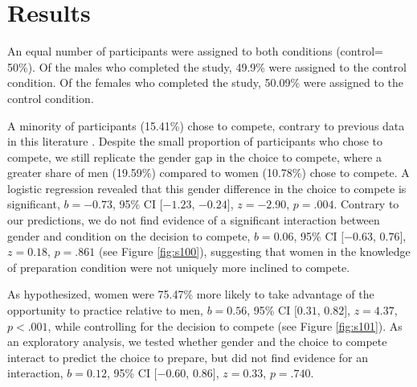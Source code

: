\documentclass[a4paper, nobind]{templates/ociamthesis}
\begin{document}
\hypertarget{results}{%
\section{Results}\label{results}}

An equal number of participants were assigned to both conditions (control= 50\%). Of the males who completed the study, 49.9\% were assigned to the control condition. Of the females who completed the study, 50.09\% were assigned to the control condition.

A minority of participants (15.41\%) chose to compete, contrary to previous data in this literature \autocite{Niederle2007}. Despite the small proportion of participants who chose to compete, we still replicate the gender gap in the choice to compete, where a greater share of men (19.59\%) compared to women (10.78\%) chose to compete. A logistic regression revealed that this gender difference in the choice to compete is significant, \(b = -0.73\), 95\% CI \([-1.23\), \(-0.24]\), \(z = -2.90\), \(p = .004\). Contrary to our predictions, we do not find evidence of a significant interaction between gender and condition on the decision to compete, \(b = 0.06\), 95\% CI \([-0.63\), \(0.76]\), \(z = 0.18\), \(p = .861\) (see Figure \ref{fig:s100}), suggesting that women in the knowledge of preparation condition were not uniquely more inclined to compete.

As hypothesized, women were 75.47\% more likely to take advantage of the opportunity to practice relative to men, \(b = 0.56\), 95\% CI \([0.31\), \(0.82]\), \(z = 4.37\), \(p < .001\), while controlling for the decision to compete (see Figure \ref{fig:s101}). As an exploratory analysis, we tested whether gender and the choice to compete interact to predict the choice to prepare, but did not find evidence for an interaction, \(b = 0.12\), 95\% CI \([-0.60\), \(0.86]\), \(z = 0.33\), \(p = .740\).
\end{document}
